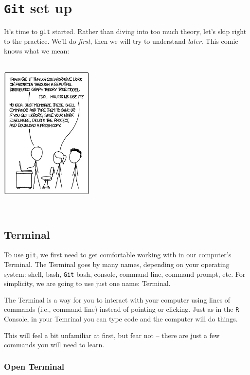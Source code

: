 \documentclass[]{book}
\begin{document}
\hypertarget{git-set-up}{%
\section*{\texorpdfstring{\texttt{Git} set up}{Git set up}}\label{git-set-up}}

It's time to \texttt{git} started. Rather than diving into too much theory, let's skip right to the practice. We'll do \emph{first}, then we will try to understand \emph{later}. This comic knows what we mean:

~\\

\includegraphics[width=0.35\textwidth,height=\textheight]{img/git.png}

~

\hypertarget{terminal}{%
\subsection*{Terminal}\label{terminal}}

To use \texttt{git}, we first need to get comfortable working with in our computer's Terminal. The Terminal goes by many names, depending on your operating system: shell, bash, \texttt{Git} bash, console, command line, command prompt, etc. For simplicity, we are going to use just one name: Terminal.

The Terminal is a way for you to interact with your computer using lines of commands (i.e., command line) instead of pointing or clicking. Just as in the \texttt{R} Console, in your Temrinal you can type code and the computer will do things.

This will feel a bit unfamiliar at first, but fear not -- there are just a few commands you will need to learn.

\hypertarget{open-terminal}{%
\subsubsection*{Open Terminal}\label{open-terminal}}
\end{document}
